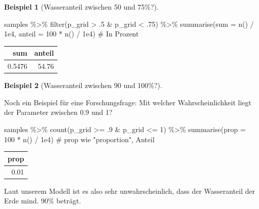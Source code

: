 \documentclass[
  a4paper,
  DIV=11]{scrreprt}
\newenvironment{Shaded}{\begin{snugshade}}{\end{snugshade}}
\newcommand{\AttributeTok}[1]{\textcolor[rgb]{0.40,0.45,0.13}{#1}}
\newcommand{\CommentTok}[1]{\textcolor[rgb]{0.37,0.37,0.37}{#1}}
\newcommand{\DecValTok}[1]{\textcolor[rgb]{0.68,0.00,0.00}{#1}}
\newcommand{\FloatTok}[1]{\textcolor[rgb]{0.68,0.00,0.00}{#1}}
\newcommand{\FunctionTok}[1]{\textcolor[rgb]{0.28,0.35,0.67}{#1}}
\newcommand{\NormalTok}[1]{\textcolor[rgb]{0.00,0.23,0.31}{#1}}
\newcommand{\SpecialCharTok}[1]{\textcolor[rgb]{0.37,0.37,0.37}{#1}}
\theoremstyle{definition}
\newtheorem{example}{Beispiel}[chapter]
\theoremstyle{remark}
\begin{document}
\begin{example}[Wasseranteil zwischen 50 und 75\%?]
\begin{Shaded}
\begin{Highlighting}[]
\NormalTok{samples }\SpecialCharTok{\%\textgreater{}\%} 
  \FunctionTok{filter}\NormalTok{(p\_grid }\SpecialCharTok{\textgreater{}}\NormalTok{ .}\DecValTok{5} \SpecialCharTok{\&}\NormalTok{ p\_grid }\SpecialCharTok{\textless{}}\NormalTok{ .}\DecValTok{75}\NormalTok{) }\SpecialCharTok{\%\textgreater{}\%} 
  \FunctionTok{summarise}\NormalTok{(}\AttributeTok{sum     =}       \FunctionTok{n}\NormalTok{() }\SpecialCharTok{/} \FloatTok{1e4}\NormalTok{,}
            \AttributeTok{anteil =} \DecValTok{100} \SpecialCharTok{*} \FunctionTok{n}\NormalTok{() }\SpecialCharTok{/} \FloatTok{1e4}\NormalTok{)  }\CommentTok{\# In Prozent}
\end{Highlighting}
\end{Shaded}

\begin{longtable}[]{@{}rr@{}}
\toprule()
sum & anteil \\
\midrule()
\endhead
0.5476 & 54.76 \\
\bottomrule()
\end{longtable}

\end{example}

\leavevmode{}%
\begin{example}[Wasseranteil zwischen 90 und 100\%?]\label{exm-param3}

Noch ein Beispiel für eine Forschungsfrage: Mit welcher
Wahrscheinlichkeit liegt der Parameter zwischen 0.9 und 1?

\begin{Shaded}
\begin{Highlighting}[]
\NormalTok{samples }\SpecialCharTok{\%\textgreater{}\%} 
  \FunctionTok{count}\NormalTok{(p\_grid }\SpecialCharTok{\textgreater{}=}\NormalTok{ .}\DecValTok{9} \SpecialCharTok{\&}\NormalTok{ p\_grid }\SpecialCharTok{\textless{}=} \DecValTok{1}\NormalTok{) }\SpecialCharTok{\%\textgreater{}\%} 
  \FunctionTok{summarise}\NormalTok{(}\AttributeTok{prop =} \DecValTok{100} \SpecialCharTok{*} \FunctionTok{n}\NormalTok{() }\SpecialCharTok{/} \FloatTok{1e4}\NormalTok{)  }\CommentTok{\# prop wie "proportion", Anteil}
\end{Highlighting}
\end{Shaded}

\begin{longtable}[]{@{}r@{}}
\toprule()
prop \\
\midrule()
\endhead
0.01 \\
\bottomrule()
\end{longtable}

Laut unserem Modell ist es also sehr unwahrscheinlich, dass der
Wasseranteil der Erde mind. 90\% beträgt.

\end{example}
\end{document}
